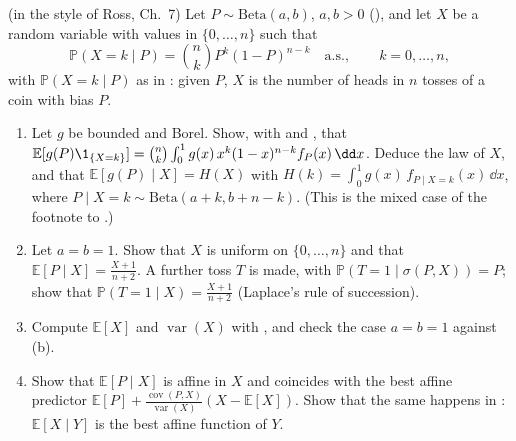 \begin{exercise}\label{ex:cp-beta-binomial}
\medium (in the style of Ross, Ch.~7) Let $P\sim\mathrm{Beta}(a,b)$, $a,b>0$
(), and let $X$ be a random variable with values in $\{0,\dots,n\}$ such that
\[
  \mathbb P(X=k\mid P)=\binom nkP^k(1-P)^{n-k}\quad\text{a.s.},\qquad k=0,\dots,n,
\]
with $\mathbb P(X=k\mid P)$ as in : given $P$, $X$ is the
number of heads in $n$ tosses of a coin with bias $P$.
\begin{enumerate}[label=(\alph*)]
  \item Let $g$ be bounded and Borel. Show, with  and
    , that
    $\mathbb E[g(P)\1_{\{X=k\}}]=\binom nk\int_0^1g(x)\,x^k(1-x)^{n-k}f_P(x)\,\dd x$. Deduce the law of
    $X$, and that $\mathbb E[g(P)\mid X]=H(X)$ with $H(k)=\int_0^1g(x)\,f_{P\mid X=k}(x)\,\dd x$, where
    $P\mid X=k\sim\mathrm{Beta}(a+k,b+n-k)$. (This is the mixed case of the footnote to
    .)
  \item Let $a=b=1$. Show that $X$ is uniform on $\{0,\dots,n\}$ and that
    $\mathbb E[P\mid X]=\frac{X+1}{n+2}$. A further toss $T$ is made, with
    $\mathbb P(T=1\mid\sigma(P,X))=P$; show that $\mathbb P(T=1\mid X)=\frac{X+1}{n+2}$ (Laplace's rule
    of succession).
  \item Compute $\mathbb E[X]$ and $\operatorname{var}(X)$ with ,
    and check the case $a=b=1$ against (b).
  \item Show that $\mathbb E[P\mid X]$ is affine in $X$ and coincides with the best affine predictor
    $\mathbb E[P]+\frac{\operatorname{cov}(P,X)}{\operatorname{var}(X)}(X-\mathbb E[X])$. Show that the
    same happens in : $\mathbb E[X\mid Y]$ is the best affine function
    of $Y$.
\end{enumerate}
\end{exercise}

